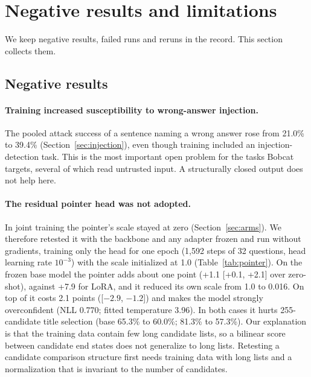 \section{Negative results and limitations}
\label{sec:limits}

We keep negative results, failed runs and reruns in the record. This section collects them.

\subsection{Negative results}

\paragraph{Training increased susceptibility to wrong-answer injection.}
The pooled attack success of a sentence naming a wrong answer rose from 21.0\% to 39.4\%
(Section~\ref{sec:injection}), even though training included an injection-detection task. This
is the most important open problem for the tasks Bobcat targets, several of which read
untrusted input. A structurally closed output does not help here.

\paragraph{The residual pointer head was not adopted.}
In joint training the pointer's scale stayed at zero (Section~\ref{sec:arms}). We therefore
retested it with the backbone and any adapter frozen and run without gradients, training only
the head for one epoch (1,592 steps of 32 questions, head learning rate $10^{-3}$) with the
scale initialized at 1.0 (Table~\ref{tab:pointer}). On the frozen base model the pointer adds
about one point (+1.1 [+0.1, +2.1] over zero-shot), against +7.9 for LoRA, and it reduced its own
scale from 1.0 to 0.016. On top of \expone{} it costs 2.1 points ([$-2.9$, $-1.2$]) and makes
the model strongly overconfident (NLL 0.770; fitted temperature 3.96). In both cases it hurts
255-candidate title selection (base 65.3\% to 60.0\%; \expone{} 81.3\% to 57.3\%). Our
explanation is that the training data contain few long candidate lists, so a bilinear score
between candidate end states does not generalize to long lists. Retesting a candidate
comparison structure first needs training data with long lists and a normalization that is
invariant to the number of candidates.

